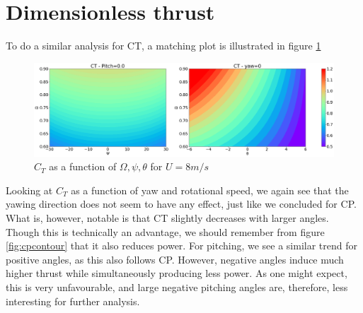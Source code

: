\section{Dimensionless thrust}

To do a similar analysis for CT, a matching plot is illustrated in figure \ref{fig:ctcontour}

\label{dimensionless_thrust}
\begin{figure}[H]
    \centering
    \includegraphics[scale=0.23]{Illustrations/ctcontour.png}
    \caption{$C_T$ as a function of $\Omega, \psi, \theta$ for $U=8 m/s$}
    \label{fig:ctcontour}
\end{figure}

Looking at $C_T$ as a function of yaw and rotational speed, we again see that the yawing direction does not seem to have any effect, just like we concluded for CP. What is, however, notable is that CT slightly decreases with larger angles. Though this is technically an advantage, we should remember from figure \ref{fig:cpcontour} that it also reduces power. For pitching, we see a similar trend for positive angles, as this also follows CP. However, negative angles induce much higher thrust while simultaneously producing less power. As one might expect, this is very unfavourable, and large negative pitching angles are, therefore, less interesting for further analysis.